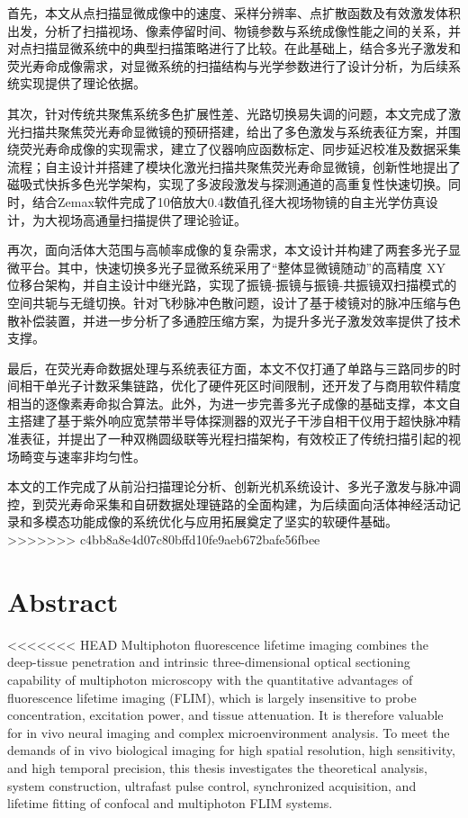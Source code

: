 首先，本文从点扫描显微成像中的速度、采样分辨率、点扩散函数及有效激发体积出发，分析了扫描视场、像素停留时间、物镜参数与系统成像性能之间的关系，并对点扫描显微系统中的典型扫描策略进行了比较。在此基础上，结合多光子激发和荧光寿命成像需求，对显微系统的扫描结构与光学参数进行了设计分析，为后续系统实现提供了理论依据。

其次，针对传统共聚焦系统多色扩展性差、光路切换易失调的问题，本文完成了激光扫描共聚焦荧光寿命显微镜的预研搭建，给出了多色激发与系统表征方案，并围绕荧光寿命成像的实现需求，建立了仪器响应函数标定、同步延迟校准及数据采集流程；自主设计并搭建了模块化激光扫描共聚焦荧光寿命显微镜，创新性地提出了磁吸式快拆多色光学架构，实现了多波段激发与探测通道的高重复性快速切换。同时，结合Zemax软件完成了10倍放大0.4数值孔径大视场物镜的自主光学仿真设计，为大视场高通量扫描提供了理论验证。

再次，面向活体大范围与高帧率成像的复杂需求，本文设计并构建了两套多光子显微平台。其中，快速切换多光子显微系统采用了``整体显微镜随动''的高精度 XY 位移台架构，并自主设计中继光路，实现了振镜-振镜与振镜-共振镜双扫描模式的空间共轭与无缝切换。针对飞秒脉冲色散问题，设计了基于棱镜对的脉冲压缩与色散补偿装置，并进一步分析了多通腔压缩方案，为提升多光子激发效率提供了技术支撑。

最后，在荧光寿命数据处理与系统表征方面，本文不仅打通了单路与三路同步的时间相干单光子计数采集链路，优化了硬件死区时间限制，还开发了与商用软件精度相当的逐像素寿命拟合算法。此外，为进一步完善多光子成像的基础支撑，本文自主搭建了基于紫外响应宽禁带半导体探测器的双光子干涉自相干仪用于超快脉冲精准表征，并提出了一种双椭圆级联等光程扫描架构，有效校正了传统扫描引起的视场畸变与速率非均匀性。

本文的工作完成了从前沿扫描理论分析、创新光机系统设计、多光子激发与脉冲调控，到荧光寿命采集和自研数据处理链路的全面构建，为后续面向活体神经活动记录和多模态功能成像的系统优化与应用拓展奠定了坚实的软硬件基础。
>>>>>>> c4bb8a8e4d07c80bffd10fe9aeb672bafe56fbee

\intobmk\chapter*{Abstract}%
<<<<<<< HEAD
Multiphoton fluorescence lifetime imaging combines the deep-tissue penetration and intrinsic three-dimensional optical sectioning capability of multiphoton microscopy with the quantitative advantages of fluorescence lifetime imaging (FLIM), which is largely insensitive to probe concentration, excitation power, and tissue attenuation. It is therefore valuable for in vivo neural imaging and complex microenvironment analysis. To meet the demands of in vivo biological imaging for high spatial resolution, high sensitivity, and high temporal precision, this thesis investigates the theoretical analysis, system construction, ultrafast pulse control, synchronized acquisition, and lifetime fitting of confocal and multiphoton FLIM systems.

